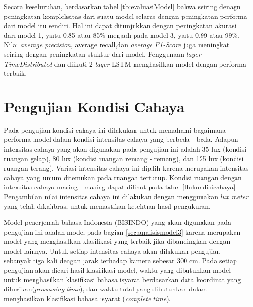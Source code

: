 Secara keseluruhan, berdasarkan tabel \ref{tb:evaluasiModel} bahwa seiring denagn peningkatan kompleksitas dari suatu model selaras dengan peningkatan performa dari model itu sendiri. Hal ini dapat ditunjukkan dengan peningkatan akurasi dari model 1, yaitu 0.85 atau 85\% menjadi pada model 3, yaitu 0.99 atau 99\%. Nilai \emph{average precision}, {average recall},dan \emph{average F1-Score} juga meningkat seiring dengan peningkatan stuktur dari model. Penggunaan \emph{layer TimeDistributed} dan diikuti 2 \emph{layer} LSTM menghasilkan model dengan performa terbaik.

\section{Pengujian Kondisi Cahaya}
\label{sec:analisiscahaya}

Pada pengujian kondisi cahaya ini dilakukan untuk memahami bagaimana performa model dalam kondisi intensitas cahaya  yang berbeda - beda. Adapun intensitas cahaya yang akan digunakan pada pengujian ini adalah 35 lux (kondisi ruangan gelap), 80 lux (kondisi ruangan remang - remang), dan 125 lux (kondisi ruangan terang). Variasi intensitas cahaya ini dipilih karena merupakan intensitas cahaya yang umum ditemukan pada ruangan tertutup. Kondisi ruangan dengan intensitas cahaya masing - masing dapat dilihat pada tabel \ref{tb:kondisicahaya}. Pengambilan nilai intensitas cahaya ini dilakukan dengan menggunakan \emph{lux meter} yang telah dikalibrasi untuk memastikan ketelitian hasil pengukuran.

Model penerjemah bahasa Indonesia (BISINDO) yang akan digunakan pada pengujian ini adalah model pada bagian \ref{sec:analisismodel3} karena merupakan model yang menghasilkan klasifikasi yang terbaik jika dibandingkan dengan model lainnya. Untuk setiap intensitas cahaya akan dilakukan pengujian sebanyak tiga kali dengan jarak terhadap kamera sebesar 300 cm. Pada setiap pengujian akan dicari hasil klasifikasi model, waktu yang dibutuhkan model untuk menghasilkan klasifikasi bahasa isyarat berdasarkan data koordinat yang diberikan(\emph{processing time}), dan waktu total yang dibutuhkan dalam menghasilkan klasifikasi bahasa isyarat (\emph{complete time}).  

